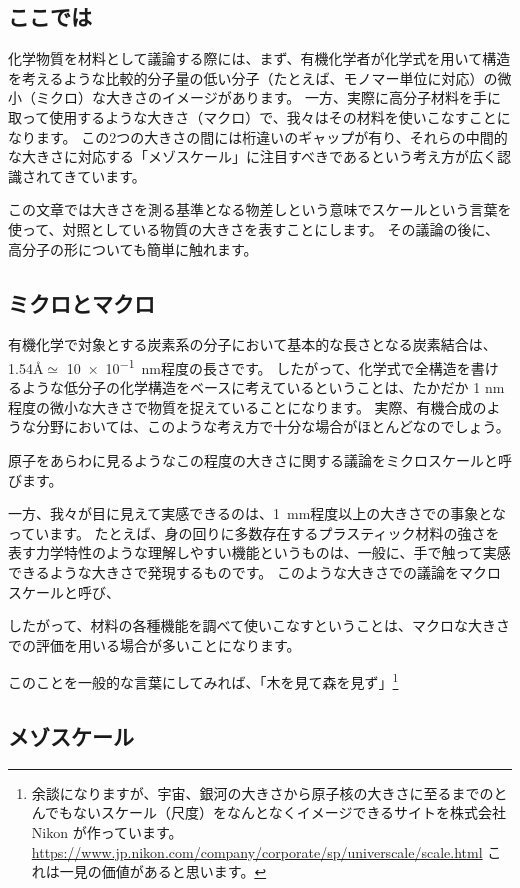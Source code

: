 \documentclass[a4paper,11pt]{jlreq}
\begin{document}
\subsection{ここでは}
化学物質を材料として議論する際には、まず、有機化学者が化学式を用いて構造を考えるような比較的分子量の低い分子（たとえば、モノマー単位に対応）の微小（ミクロ）な大きさのイメージがあります。
一方、実際に高分子材料を手に取って使用するような大きさ（マクロ）で、我々はその材料を使いこなすことになります。
この2つの大きさの間には桁違いのギャップが有り、それらの中間的な大きさに対応する「メゾスケール」に注目すべきであるという考え方が広く認識されてきています。

この文章では大きさを測る基準となる物差しという意味でスケールという言葉を使って、対照としている物質の大きさを表すことにします。
その議論の後に、高分子の形についても簡単に触れます。

\subsection{ミクロとマクロ}

有機化学で対象とする炭素系の分子において基本的な長さとなる炭素結合は、1.54\AA $\simeq$ \qty{10e-1}{\nano\meter}程度の長さです。
したがって、化学式で全構造を書けるような低分子の化学構造をベースに考えているということは、たかだか 1 nm 程度の微小な大きさで物質を捉えていることになります。
実際、有機合成のような分野においては、このような考え方で十分な場合がほとんどなのでしょう。

原子をあらわに見るようなこの程度の大きさに関する議論をミクロスケールと呼びます。

一方、我々が目に見えて実感できるのは、\qty{1}{\mm}程度以上の大きさでの事象となっています。
たとえば、身の回りに多数存在するプラスティック材料の強さを表す力学特性のような理解しやすい機能というものは、一般に、手で触って実感できるような大きさで発現するものです。
このような大きさでの議論をマクロスケールと呼び、

したがって、材料の各種機能を調べて使いこなすということは、マクロな大きさでの評価を用いる場合が多いことになります。

このことを一般的な言葉にしてみれば、「木を見て森を見ず」\footnote{余談になりますが、宇宙、銀河の大きさから原子核の大きさに至るまでのとんでもないスケール（尺度）をなんとなくイメージできるサイトを株式会社 Nikon が作っています。
	\url{https://www.jp.nikon.com/company/corporate/sp/universcale/scale.html}
	これは一見の価値があると思います。
}

\subsection{メゾスケール}
\end{document}
